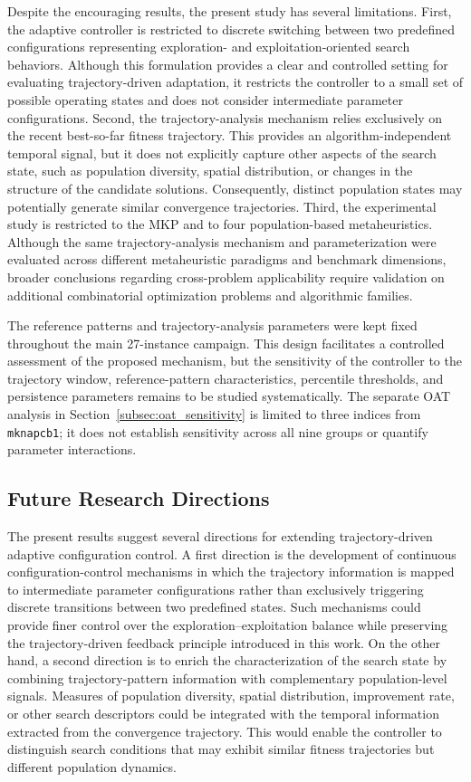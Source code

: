\documentclass[journal,article,submit,moreauthors]{Definitions/mdpi}
\begin{document}
Despite the encouraging results, the present study has several limitations.
First, the adaptive controller is restricted to discrete switching between
two predefined configurations representing exploration- and
exploitation-oriented search behaviors. Although this formulation provides
a clear and controlled setting for evaluating trajectory-driven adaptation,
it restricts the controller to a small set of possible operating states and
does not consider intermediate parameter configurations. Second, the trajectory-analysis mechanism relies exclusively on the recent best-so-far fitness trajectory. This provides an algorithm-independent temporal signal, but it does not explicitly capture other aspects of the search state, such as population diversity, spatial distribution, or changes in the structure of the candidate solutions. Consequently, distinct population states may potentially generate similar convergence trajectories. Third, the experimental study is restricted to the MKP and to four population-based metaheuristics. Although the same trajectory-analysis mechanism and parameterization were evaluated across different
metaheuristic paradigms and benchmark dimensions, broader conclusions
regarding cross-problem applicability require validation on additional
combinatorial optimization problems and algorithmic families.

The reference patterns and trajectory-analysis parameters were
kept fixed throughout the main 27-instance campaign. This design facilitates a
controlled assessment of the proposed mechanism, but the sensitivity of the
controller to the trajectory window, reference-pattern characteristics,
percentile thresholds, and persistence parameters remains to be studied
systematically. The separate OAT analysis in
Section~\ref{subsec:oat_sensitivity} is limited to three indices from
\texttt{mknapcb1}; it does not establish sensitivity across all nine
groups or quantify parameter interactions.


\subsection{Future Research Directions}
\label{subsec:future_work}

The present results suggest several directions for extending
trajectory-driven adaptive configuration control. A first direction is the
development of continuous configuration-control mechanisms in which the
trajectory information is mapped to intermediate parameter configurations
rather than exclusively triggering discrete transitions between two
predefined states. Such mechanisms could provide finer control over the
exploration--exploitation balance while preserving the trajectory-driven
feedback principle introduced in this work. On the other hand, a second direction is to enrich the characterization of the search state by combining trajectory-pattern information with complementary population-level signals. Measures of population diversity, spatial distribution, improvement rate, or other search descriptors could be integrated with the temporal information extracted from the convergence trajectory. This would enable the controller to distinguish search conditions that may exhibit similar fitness trajectories but different population dynamics.
\end{document}
